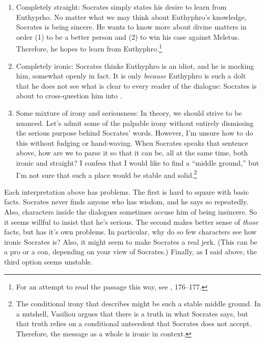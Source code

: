 \documentclass[11pt]{article}
\begin{document}
\begin{enumerate}

    \item Completely straight: Socrates simply states his desire to learn
        from Euthyprho.  No matter what we may think about Euthyphro's
        knowledge, Socrates is being sincere.  He wants to know more about
        divine matters in order (1) to be a better person and (2) to win
        his case against Meletus.  Therefore, he hopes to learn from
        Euthyphro.\footnote{For an attempt to read the passage this way,
        see \citet{wolfsdorf2007}, 176--177.}

    \item Completely ironic: Socrates thinks Euthyphro is an idiot, and he
        is mocking him, somewhat openly in fact.  It is only \emph{because}
        Euthyphro is such a dolt that he does not see what is clear to
        every reader of the dialogue: Socrates is about to cross-question
        him into .

    \item Some mixture of irony and seriousness: In theory, we should
        strive to be nuanced.  Let's admit some of the palpable irony
        without entirely dismissing the serious purpose behind Socrates'
        words.  However, I'm unsure how to do this without fudging or
        hand-waving.  When Socrates speaks that sentence above, how are we
        to parse it so that it can be, all at the same time, both ironic
        and straight?  I confess that I would like to find a ``middle
        ground,'' but I'm not sure that such a place would be stable and
        solid.\footnote{The conditional irony that \citet{vasiliou1998}
        describes might be such a stable middle ground.  In a nutshell,
        Vasiliou argues that there is a truth in what Socrates says, but
        that truth relies on a conditional antecedent that Socrates does
        not accept.  Therefore, the message as a whole is ironic in
        context.}

\end{enumerate}

Each interpretation above has problems.  The first is hard to square with
basic facts.  Socrates never finds anyone who has wisdom, and he says so
repeatedly.  Also, characters inside the dialogues sometimes accuse him of
being insincere.  So it seems willful to insist that he's serious.  The
second makes better sense of \emph{those} facts, but has it's own problems.
In particular, why do so few characters see how ironic Socrates is?  Also,
it might seem to make Socrates a real jerk.  (This can be a pro or a con,
depending on your view of Socrates.)  Finally, as I said above, the third
option seems unstable.
\end{document}
